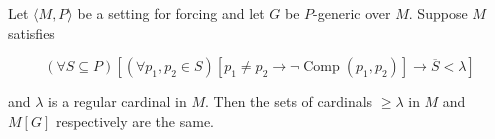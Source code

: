 Let $\langle M, P \rangle$ be a setting for forcing and let $G$ be $P$-generic over $M$. Suppose $M$ satisfies

$$(\forall S \subseteq P)\left[(\forall p_1, p_2 \in S)[p_1 \neq p_2 \rightarrow \neg \operatorname{Comp}(p_1, p_2)] \rightarrow \overline{S} < \lambda\right]$$

and $\lambda$ is a regular cardinal in $M$. Then the sets of cardinals $\geq \lambda$ in $M$ and $M[G]$ respectively are the same.
